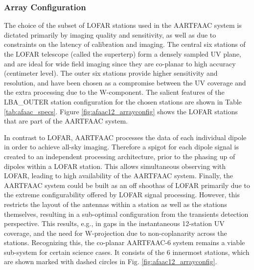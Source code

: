 \documentclass{ws-jai}
\begin{document}
\subsubsection {Array Configuration}
 The  choice  of the  subset of  LOFAR
stations used  in the AARTFAAC system  is dictated primarily by  imaging quality
and sensitivity, as well as due to constraints on the latency of calibration and
imaging. The central six stations of  the LOFAR telescope (called the superterp)
form a densely sampled UV plane, and are ideal for wide field imaging since they
are  co-planar to  high accuracy  (centimeter  level).  The  outer six  stations
provide higher sensitivity and resolution, and  have been chosen as a compromise
between the  UV coverage and the  extra processing due to  the W-component.  The
salient features of the LBA\_OUTER station configuration for the chosen stations
are     shown     in           Table     \ref{tab:afaac_specs}.      Figure
\ref{fig:afaac12_arrayconfig}  shows the  LOFAR stations  that are  part of  the
AARTFAAC system.

In contrast to  LOFAR, AARTFAAC processes the data of  each individual dipole in
order to achieve  all-sky imaging. Therefore a spigot for  each dipole signal is
created to  an independent processing architecture,  prior to the phasing  up of
dipoles within a LOFAR station.   This allows simultaneous observing with LOFAR,
leading  to high  availability of  the AARTFAAC  system.  Finally,  the AARTFAAC
system could be built  as an off shoothas of LOFAR primarily  due to the extreme
configurability offered by LOFAR signal processing.  However, this restricts the
layout of  the antennas  within a  station as well  as the  stations themselves,
resulting  in   a  sub-optimal  configuration  from   the  transients  detection
perspective.  This  results, e.g.,  in gaps in  the instantaneous  12-station UV
coverage,  and the  need  for  W-projection due  to  non-coplanarity across  the
stations.  Recognizing  this, the co-planar  AARTFAAC-6 system remains  a viable
sub-system for certain  science cases. It consists of the  6 innermost stations,
which      are      shown      marked      with      dashed      circles      in
Fig. \ref{fig:afaac12_arrayconfig}.
\end{document}
